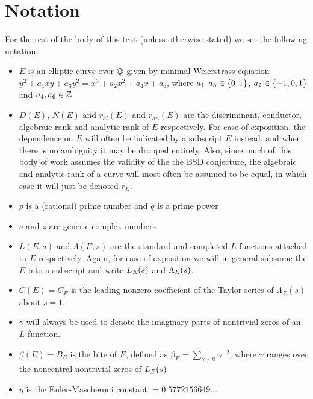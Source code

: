 
\section{Notation}\label{subsec:notation}

For the rest of the body of this text (unless otherwise stated) we set the following notation:
\begin{itemize}
\item $E$ is an elliptic curve over $\mathbb{Q}$ given by minimal Weierstrass equation $y^2 + a_1 xy + a_3 y^2 = x^3 + a_2 x^2 + a_4 x + a_6$, where $a_1, a_3 \in \left\{0,1\right\}$, $a_2 \in \left\{-1,0,1\right\}$ and $a_4,a_6 \in \mathbb{Z}$
\item $D(E)$, $N(E)$ and $r_{al}(E)$  and $r_{an}(E)$ are the discriminant, conductor, algebraic rank and analytic rank of $E$ respectively. For ease of exposition, the dependence on $E$ will often be indicated by a subscript $E$ instead, and when there is no ambiguity it may be dropped entirely. Also, since much of this body of work assumes the validity of the the BSD conjecture, the algebraic and analytic rank of a curve will most often be assumed to be equal, in which case it will just be denoted $r_E$.
\item $p$ is a (rational) prime number and $q$ is a prime power
\item $s$ and $z$ are generic complex numbers
\item $L(E,s)$ and $\Lambda(E,s)$ are the standard and completed $L$-functions attached to $E$ respectively. Again, for ease of exposition we will in general subsume the $E$ into a subscript and write $L_E(s)$ and $\Lambda_E(s)$.
\item $C(E) = C_E$ is the leading nonzero coefficient of the Taylor series of $\Lambda_E(s)$ about $s=1$.
\item $\gamma$ will always be used to denote the imaginary parts of nontrivial zeros of an $L$-function.
\item $\beta(E) = B_E$ is the bite of $E$, defined as $\beta_E = \sum_{\gamma\ne 0} \gamma^{-2}$, where $\gamma$ ranges over the noncentral nontrivial zeros of $L_E(s)$
\item $\eta$ is the Euler-Mascheroni constant $= 0.5772156649\ldots$ \\
\end{itemize}

